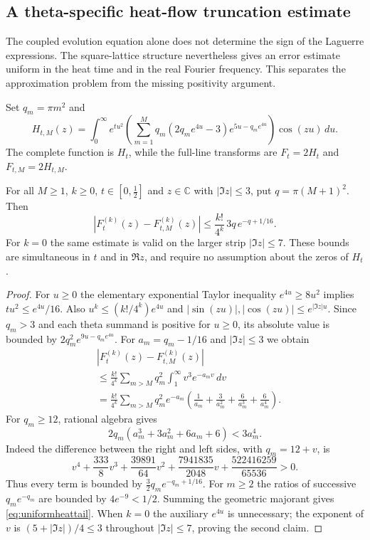 \subsection{A theta-specific heat-flow truncation estimate}
\label{sec:heattail}
The coupled evolution equation alone does not determine the
sign of the Laguerre expressions. The square-lattice structure
nevertheless gives an error estimate uniform in the heat time
and in the real Fourier frequency. This separates the
approximation problem from the missing positivity argument.

Set $q_m=\pi m^2$ and
\[
H_{t,M}(z)=\int_0^\infty e^{tu^2}
\left(\sum_{m=1}^M
q_m(2q_me^{4u}-3)e^{5u-q_me^{4u}}\right)
\cos(zu)\,du .
\]
The complete function is $H_t$, while the
full-line transforms are $F_t=2H_t$ and $F_{t,M}=2H_{t,M}$.

\begin{theorem}
\label{thm:uniformheattail}
For all $M\ge1$, $k\ge0$,
$t\in[0,\tfrac12]$ and
$z\in\mathbb C$ with $|\Im z|\le3$,
put $q=\pi(M+1)^2$. Then
\begin{equation}
\left|F_t^{(k)}(z)-F_{t,M}^{(k)}(z)\right|
\le\frac{k!}{4^k}\,3q\,e^{-q+1/16}.
\label{eq:uniformheattail}
\end{equation}
For $k=0$ the same estimate is valid
on the larger strip $|\Im z|\le7$.
These bounds are simultaneous in $t$ and
in $\Re z$, and require no assumption
about the zeros of $H_t$.
\end{theorem}
\begin{proof}
For $u\ge0$ the elementary exponential
Taylor inequality $e^{4u}\ge8u^2$
implies $tu^2\le e^{4u}/16$.
Also $u^k\le(k!/4^k)e^{4u}$ and
$|\sin(zu)|,|\cos(zu)|\le e^{|\Im z|u}$.
Since $q_m>3$ and each theta
summand is positive for $u\ge0$,
its absolute value is bounded by
$2q_m^2e^{9u-q_me^{4u}}$.
For $a_m=q_m-1/16$ and $|\Im z|\le3$
we obtain
\begin{align*}
&\left|F_t^{(k)}(z)-F_{t,M}^{(k)}(z)\right|\\
&\le\frac{k!}{4^k}
\sum_{m>M}q_m^2\int_1^\infty
v^3e^{-a_mv}\,dv\\
&=\frac{k!}{4^k}\sum_{m>M}
q_m^2e^{-a_m}
\left(\frac1{a_m}+\frac3{a_m^2}
+\frac6{a_m^3}+\frac6{a_m^4}\right).
\end{align*}
For $q_m\ge12$, rational algebra gives
\begin{equation}
2q_m(a_m^3+3a_m^2+6a_m+6)
<3a_m^4 .
\label{eq:heatrationalgate}
\end{equation}
Indeed the difference between the right
and left sides, with $q_m=12+v$, is
\[
v^4+\frac{333}8v^3+
\frac{39891}{64}v^2+
\frac{7941835}{2048}v+
\frac{522416259}{65536}>0 .
\]
Thus every term is bounded by
$\tfrac32q_me^{-q_m+1/16}$.
For $m\ge2$ the ratios of successive
$q_me^{-q_m}$ are bounded by
$4e^{-9}<1/2$. Summing the geometric
majorant gives \eqref{eq:uniformheattail}.
When $k=0$ the auxiliary $e^{4u}$
is unnecessary; the exponent of $v$
is $(5+|\Im z|)/4\le3$ throughout
$|\Im z|\le7$, proving the second claim.
\end{proof}

